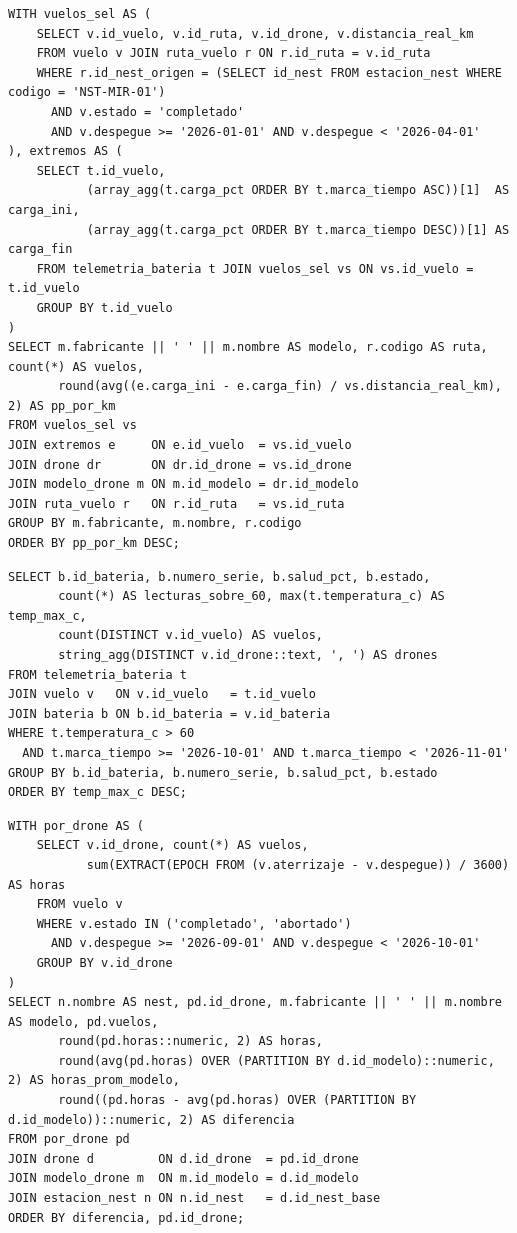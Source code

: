 \begin{lstlisting}[style=sql,title={C2}]
WITH vuelos_sel AS (
    SELECT v.id_vuelo, v.id_ruta, v.id_drone, v.distancia_real_km
    FROM vuelo v JOIN ruta_vuelo r ON r.id_ruta = v.id_ruta
    WHERE r.id_nest_origen = (SELECT id_nest FROM estacion_nest WHERE codigo = 'NST-MIR-01')
      AND v.estado = 'completado'
      AND v.despegue >= '2026-01-01' AND v.despegue < '2026-04-01'
), extremos AS (
    SELECT t.id_vuelo,
           (array_agg(t.carga_pct ORDER BY t.marca_tiempo ASC))[1]  AS carga_ini,
           (array_agg(t.carga_pct ORDER BY t.marca_tiempo DESC))[1] AS carga_fin
    FROM telemetria_bateria t JOIN vuelos_sel vs ON vs.id_vuelo = t.id_vuelo
    GROUP BY t.id_vuelo
)
SELECT m.fabricante || ' ' || m.nombre AS modelo, r.codigo AS ruta, count(*) AS vuelos,
       round(avg((e.carga_ini - e.carga_fin) / vs.distancia_real_km), 2) AS pp_por_km
FROM vuelos_sel vs
JOIN extremos e     ON e.id_vuelo  = vs.id_vuelo
JOIN drone dr       ON dr.id_drone = vs.id_drone
JOIN modelo_drone m ON m.id_modelo = dr.id_modelo
JOIN ruta_vuelo r   ON r.id_ruta   = vs.id_ruta
GROUP BY m.fabricante, m.nombre, r.codigo
ORDER BY pp_por_km DESC;
\end{lstlisting}

\begin{lstlisting}[style=sql,title={C3}]
SELECT b.id_bateria, b.numero_serie, b.salud_pct, b.estado,
       count(*) AS lecturas_sobre_60, max(t.temperatura_c) AS temp_max_c,
       count(DISTINCT v.id_vuelo) AS vuelos,
       string_agg(DISTINCT v.id_drone::text, ', ') AS drones
FROM telemetria_bateria t
JOIN vuelo v   ON v.id_vuelo   = t.id_vuelo
JOIN bateria b ON b.id_bateria = v.id_bateria
WHERE t.temperatura_c > 60
  AND t.marca_tiempo >= '2026-10-01' AND t.marca_tiempo < '2026-11-01'
GROUP BY b.id_bateria, b.numero_serie, b.salud_pct, b.estado
ORDER BY temp_max_c DESC;
\end{lstlisting}

\begin{lstlisting}[style=sql,title={C4}]
WITH por_drone AS (
    SELECT v.id_drone, count(*) AS vuelos,
           sum(EXTRACT(EPOCH FROM (v.aterrizaje - v.despegue)) / 3600) AS horas
    FROM vuelo v
    WHERE v.estado IN ('completado', 'abortado')
      AND v.despegue >= '2026-09-01' AND v.despegue < '2026-10-01'
    GROUP BY v.id_drone
)
SELECT n.nombre AS nest, pd.id_drone, m.fabricante || ' ' || m.nombre AS modelo, pd.vuelos,
       round(pd.horas::numeric, 2) AS horas,
       round(avg(pd.horas) OVER (PARTITION BY d.id_modelo)::numeric, 2) AS horas_prom_modelo,
       round((pd.horas - avg(pd.horas) OVER (PARTITION BY d.id_modelo))::numeric, 2) AS diferencia
FROM por_drone pd
JOIN drone d         ON d.id_drone  = pd.id_drone
JOIN modelo_drone m  ON m.id_modelo = d.id_modelo
JOIN estacion_nest n ON n.id_nest   = d.id_nest_base
ORDER BY diferencia, pd.id_drone;
\end{lstlisting}

